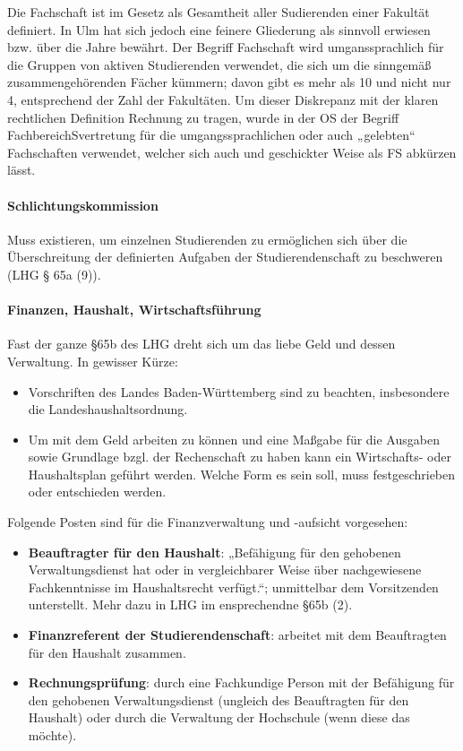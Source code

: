 \documentclass[
10pt,
a4paper,
twoside,								%
titlepage=false,							%
draft=false								%
]{scrartcl}
\begin{document}
Die Fachschaft ist im Gesetz als Gesamtheit aller Sudierenden einer Fakultät definiert. In Ulm hat sich jedoch eine feinere Gliederung als sinnvoll erwiesen bzw. über die Jahre bewährt. Der Begriff Fachschaft wird umganssprachlich für die Gruppen von aktiven Studierenden verwendet, die sich um die sinngemäß zusammengehörenden Fächer kümmern; davon gibt es mehr als 10 und nicht nur 4, entsprechend der Zahl der Fakultäten. Um dieser Diskrepanz mit der klaren rechtlichen Definition Rechnung zu tragen, wurde in der OS der Begriff FachbereichSvertretung für die umgangssprachlichen oder auch „gelebten“ Fachschaften verwendet, welcher sich auch und geschickter Weise als FS abkürzen lässt.


\paragraph{Schlichtungskommission}

Muss existieren, um einzelnen Studierenden zu ermöglichen sich über die Überschreitung der definierten Aufgaben der Studierendenschaft zu beschweren (LHG § 65a (9)).


\paragraph{Finanzen, Haushalt, Wirtschaftsführung}

Fast der ganze §65b des LHG dreht sich um das liebe Geld und dessen Verwaltung. In gewisser Kürze:
\begin{itemize}
	\item Vorschriften des Landes Baden-Württemberg sind zu beachten, insbesondere die Landeshaushaltsordnung.
	\item Um mit dem Geld arbeiten zu können und eine Maßgabe für die Ausgaben sowie Grundlage bzgl. der Rechenschaft zu haben kann ein Wirtschafts- oder Haushaltsplan geführt werden. Welche Form es sein soll, muss festgeschrieben oder entschieden werden.
\end{itemize}

Folgende Posten sind für die Finanzverwaltung und -aufsicht vorgesehen:
\begin{itemize}
	\item \textbf{Beauftragter für den Haushalt}: „Befähigung für den gehobenen Verwaltungsdienst hat oder in vergleichbarer Weise über nachgewiesene Fachkenntnisse im Haushaltsrecht verfügt.“; unmittelbar dem Vorsitzenden unterstellt. Mehr dazu in LHG im ensprechendne §65b (2).
	\item \textbf{Finanzreferent der Studierendenschaft}: arbeitet mit dem Beauftragten für den Haushalt zusammen. 
	\item \textbf{Rechnungsprüfung}: durch eine Fachkundige Person mit der Befähigung für den gehobenen Verwaltungsdienst (ungleich des Beauftragten für den Haushalt) oder durch die Verwaltung der Hochschule (wenn diese das möchte).
\end{itemize}
\end{document}
